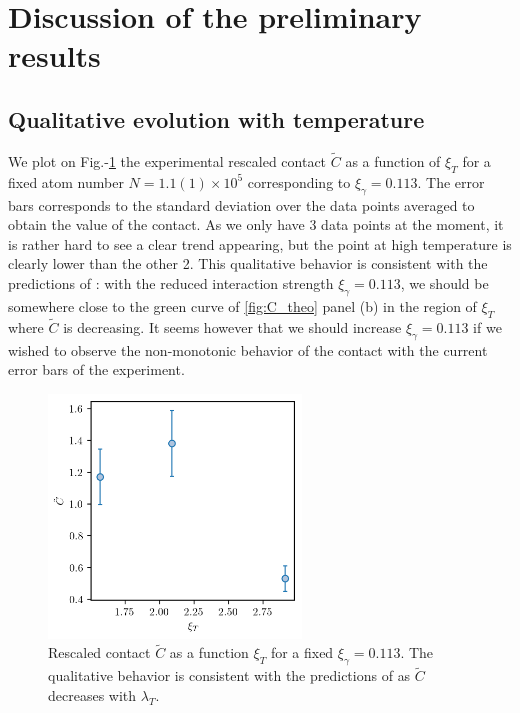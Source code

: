 \section{Discussion of the preliminary results}

\subsection{Qualitative evolution with temperature}

We plot on Fig.-\ref{fig:C_tilde_vs_T} the experimental rescaled contact $\tilde{C}$ as a function of $\xi_T$ for a fixed atom number $N=1.1(1) \times 10^5$ corresponding to $\xi_{\gamma}=0.113$. The error bars corresponds to the standard deviation over the data points averaged to obtain the value of the contact. As we only have 3 data points at the moment, it is rather hard to see a clear trend appearing, but the point at high temperature is clearly lower than the other 2. This qualitative behavior is consistent with the predictions of \cite{yao2018tan}: with the reduced interaction strength $\xi_{\gamma}=0.113$, we should be somewhere close to the green curve of \ref{fig:C_theo} panel (b) in the region of $\xi_T$ where $\tilde{C}$ is decreasing. It seems however that we should increase $\xi_{\gamma}=0.113$ if we wished to observe the non-monotonic behavior of the contact with the current error bars of the experiment.

\begin{figure}
    \centering
    \includegraphics[width=0.6\textwidth]{Fig/Chapter5/C_tilde_vs_T.png}
    \caption[Rescaled contact $\tilde{C}$ as a function $\xi_T$ for a fixed $\xi_{\gamma}=0.113$]{Rescaled contact $\tilde{C}$ as a function $\xi_T$ for a fixed $\xi_{\gamma}=0.113$. The qualitative behavior is consistent with the predictions of \cite{yao2018tan} as $\tilde{C}$ decreases with $\lambda_T$. }
    \label{fig:C_tilde_vs_T}
\end{figure}

